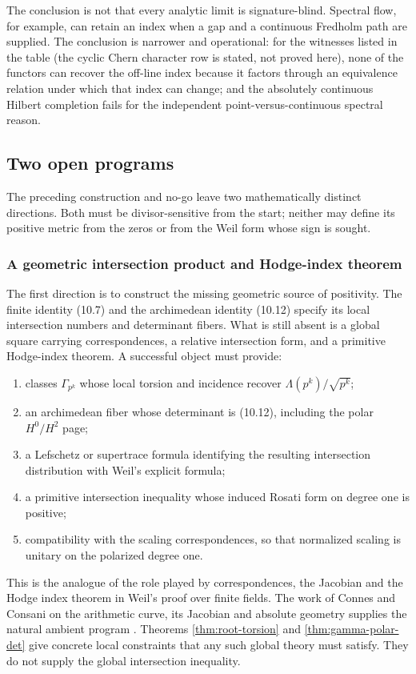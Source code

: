 \documentclass[11pt]{amsart}
\theoremstyle{definition}
\theoremstyle{remark}
\begin{document}
The conclusion is not that every analytic limit is signature-blind.
Spectral flow, for example, can retain an index when a gap and a continuous
Fredholm path are supplied.  The conclusion is narrower and operational:
for the witnesses listed in the table (the cyclic Chern character row is
stated, not proved here), none of the functors can recover the off-line
index because it factors through an equivalence relation under which that index
can change; and the absolutely continuous Hilbert completion fails for the
independent point-versus-continuous spectral reason.

\subsection{Two open programs}
\label{subsec:open-programs}

The preceding construction and no-go leave two mathematically distinct
directions.  Both must be divisor-sensitive from the start; neither may
define its positive metric from the zeros or from the Weil form whose sign
is sought.

\subsubsection{A geometric intersection product and Hodge-index theorem}

The first direction is to construct the missing geometric source of
positivity.  The finite identity (10.7) and the archimedean identity
(10.12) specify its local intersection numbers and determinant fibers.
What is still absent is a global square carrying correspondences, a
relative intersection form, and a primitive Hodge-index theorem.  A
successful object must provide:
\begin{enumerate}
\item classes \(\Gamma_{p^k}\) whose local torsion and incidence recover
\(\Lambda(p^k)/\sqrt{p^k}\);
\item an archimedean fiber whose determinant is (10.12), including the
polar \(H^0/H^2\) page;
\item a Lefschetz or supertrace formula identifying the resulting
intersection distribution with Weil's explicit formula;
\item a primitive intersection inequality whose induced Rosati form on
degree one is positive;
\item compatibility with the scaling correspondences, so that normalized
scaling is unitary on the polarized degree one.
\end{enumerate}
This is the analogue of the role played by correspondences, the Jacobian
and the Hodge index theorem in Weil's proof over finite fields.  The work of
Connes and Consani on the arithmetic curve, its Jacobian and absolute
geometry supplies the natural ambient program
\cite{CCArch,CCJacobian,CCAbsolute}.  Theorems
\ref{thm:root-torsion} and \ref{thm:gamma-polar-det} give concrete local
constraints that any such global theory must satisfy.  They do not supply
the global intersection inequality.
\end{document}

